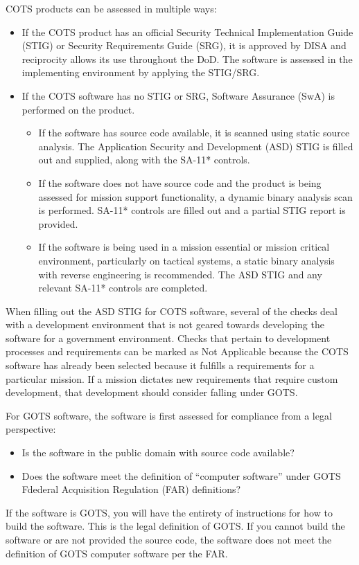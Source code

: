 COTS products can be assessed in multiple ways:
\begin{itemize}
	\item If the COTS product has an official Security Technical Implementation Guide (STIG) or Security Requirements Guide (SRG), it is approved by DISA and reciprocity allows its use throughout the DoD. The software is assessed in the implementing environment by applying the STIG/SRG.
	\item If the COTS software has no STIG or SRG, Software Assurance (SwA) is performed on the product.
	\begin{itemize}
		\item If the software has source code available, it is scanned using static source analysis. The Application Security and Development (ASD) STIG is filled out and supplied, along with the SA-11* controls.
		\item If the software does not have source code and the product is being assessed for mission support functionality, a dynamic binary analysis scan is performed. SA-11* controls are filled out and a partial STIG report is provided.
		\item If the software is being used in a mission essential or mission critical environment, particularly on tactical systems, a static binary analysis with reverse engineering is recommended. The ASD STIG and any relevant SA-11* controls are completed.
	\end{itemize}
\end{itemize}

When filling out the ASD STIG for COTS software, several of the checks deal with a development environment that is not geared towards developing the software for a government environment. Checks that pertain to development processes and requirements can be marked as Not Applicable because the COTS software has already been selected because it fulfills a requirements for a particular mission. If a mission dictates new requirements that require custom development, that development should consider falling under GOTS.

For GOTS software, the software is first assessed for compliance from a legal perspective:
\begin{itemize}
	\item Is the software in the public domain with source code available?
	\item Does the software meet the definition of ``computer software'' under GOTS Fdederal Acquisition Regulation (FAR) definitions?
\end{itemize}
If the software is GOTS, you will have the entirety of instructions for how to build the software. This is the legal definition of GOTS. If you cannot build the software or are not provided the source code, the software does not meet the definition of GOTS computer software per the FAR.

